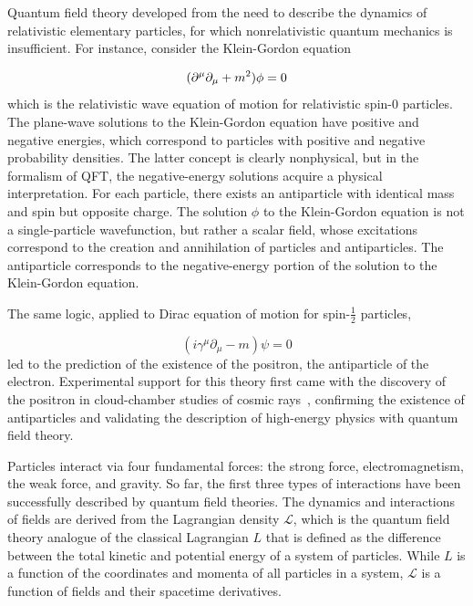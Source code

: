 Quantum field theory developed from the need to describe the dynamics of relativistic elementary particles, for which nonrelativistic quantum mechanics is insufficient. For instance, consider the Klein-Gordon equation

\begin{equation}
(\partial^{\mu}\partial_{\mu} + m^{2})\phi = 0\newline
\label{eq:KG}
\end{equation}
which is the relativistic wave equation of motion for relativistic spin-0 particles. The plane-wave solutions to the Klein-Gordon equation have positive and negative energies, which correspond to particles with positive and negative probability densities. The latter concept is clearly nonphysical, but in the formalism of QFT, the negative-energy solutions acquire a physical interpretation\cite{PeskinSchroederPhysics,ThomsonPhysics}. For each particle, there exists an antiparticle with identical mass and spin but opposite charge. The solution $\phi$ to the Klein-Gordon equation is not a single-particle wavefunction, but rather a scalar field, whose excitations correspond to the creation and annihilation of particles and antiparticles. The antiparticle corresponds to the negative-energy portion of the solution to the Klein-Gordon equation.

The same logic, applied to Dirac equation of motion for spin-$\frac{1}{2}$ particles,

\begin{equation}
(i\gamma^{\mu}\partial_{\mu} - m)\psi = 0
\label{eq:Dirac}
\end{equation}
led to the prediction of the existence of the positron, the antiparticle of the electron. Experimental support for this theory first came with the discovery of the positron in cloud-chamber studies of cosmic rays~\cite{BettiniPhysics}, confirming the existence of antiparticles and validating the description of high-energy physics with quantum field theory.

Particles interact via four fundamental forces: the strong force, electromagnetism, the weak force, and gravity. So far, the first three types of interactions have been successfully described by quantum field theories. The dynamics and interactions of fields are derived from the Lagrangian density $\mathcal{L}$, which is the quantum field theory analogue of the classical Lagrangian $L$ that is defined as the difference between the total kinetic and potential energy of a system of particles. While $L$ is a function of the coordinates and momenta of all particles in a system, $\mathcal{L}$ is a function of fields and their spacetime derivatives.

